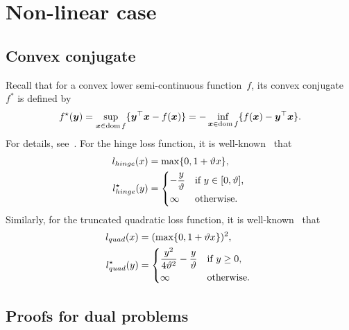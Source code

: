 \chapter{Non-linear case}

\section{Convex conjugate}

Recall that for a convex lower semi-continuous function~$f$, its convex conjugate~$f^*$ is defined by
\begin{equation*}
  f^{\star} (\bm{y})
  =  \sup_{\bm{x} \in \operatorname*{dom} f} \{\bm{y}^{\top}\bm{x} - f(\bm{x})\}
  = -\inf_{\bm{x} \in \operatorname*{dom} f} \{f(\bm{x}) - \bm{y}^{\top}\bm{x}\}.    
\end{equation*}
For details, see~\cite[page~91]{boyd2004convex}. For the hinge loss function, it is well-known~\cite{shnlev2014accelerated} that 
\begin{equation}\label{eq:Conjugate of hinge loss}
  \begin{aligned}
    l_{hinge}(x) & = \max\{0,1 + \vartheta x\}, \\
    l_{hinge}^{\star}(y) & =
      \begin{dcases*}
        -\frac{y}{\vartheta} & if~$y \in [0, \vartheta]$, \\
        \infty & otherwise.
      \end{dcases*}  
  \end{aligned}
\end{equation}
Similarly, for the truncated quadratic loss function, it is well-known~\cite{kanamori2013conjugate} that
\begin{equation}\label{eq:Conjugate of truncated quadratic loss}
  \begin{aligned}
    l_{quad}(x) &= (\max\{0,1 + \vartheta x\} )^2, \\
    l_{quad}^{\star}(y) & =
      \begin{dcases*}
        \frac{y^2}{4\vartheta^2} - \frac{y}{\vartheta} & if~$y \geq 0$, \\
        \infty & otherwise. \\
      \end{dcases*}  
  \end{aligned}
\end{equation}

\section{Proofs for dual problems}

